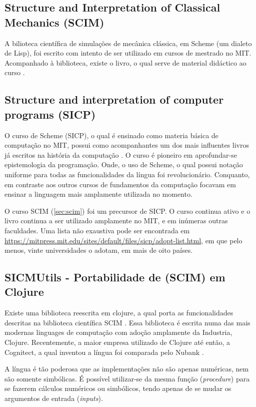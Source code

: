 \documentclass[
12pt,				%
openright,			%
oneside,			%
a4paper,			%
english,			%
french,				%
spanish,			%
brazil,				%
]{abntex2}
\begin{document}
\subsection{Structure and Interpretation of Classical Mechanics (SCIM)}
\label{sec:scim}
A bilioteca científica de simulações de mecânica clássica, em Scheme (um dialeto de Lisp), foi escrito com intento de ser utilizado em cursos de mestrado no MIT. Acompanhado à biblioteca, existe o livro, o qual serve de material didáctico ao curso \cite{sussman2015structure}.

\subsection{Structure and interpretation of computer programs (SICP)}
O curso de Scheme (SICP), o qual é ensinado como materia básica de computação no MIT, possui como acompanhantes um dos mais influentes livros já escritos na história da computação \cite{abelson1996structure}. O curso é pioneiro em aprofundar-se epistemologia da programação. Onde, o uso de Scheme, o qual possui notação uniforme para todas as funcionalidades da língua foi revolucionário. Conquanto, em contraste aos outros cursos de fundamentos da computação focavam em ensinar a linguagem mais amplamente utilizada no momento.

O curso SCIM (\autoref{sec:scim}) foi um precursor de SICP. O curso continua ativo e o livro continua a ser utilizado amplamente no MIT, e em inúmeras outras faculdades. Uma lista não exaustiva pode ser encontrada em \url{https://mitpress.mit.edu/sites/default/files/sicp/adopt-list.html}, em que pelo menos, vinte universidades o adotam, em mais de oito países.

\subsection{SICMUtils - Portabilidade de (SCIM) em Clojure}
Existe uma biblioteca reescrita em clojure, a qual porta as funcionalidades descritas na biblioteca científica SCIM \cite{sicmutils2016github}. Essa biblioteca é escrita numa das mais modernas linguages de computação com adoção amplamente da Industria, Clojure. Recentemente, a maior empresa utilizado de Clojure até então, a Cognitect, a qual inventou a língua foi comparada pelo Nubank \cite{clojure2020}.

A língua é tão poderosa que as implementações não são apenas numéricas, nem são somente simbólicas. É possível utilizar-se da mesma função (\textit{procedure}) para se fazerem cálculos numéricos ou simbólicos, tendo apenas de se mudar os argumentos de entrada (\textit{inputs}).
\end{document}
